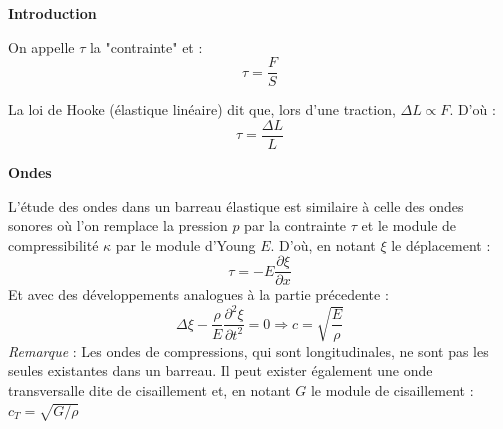 \noindent\textbf{Introduction}


On appelle $\tau$ la "contrainte" et :
\[\tau=\frac{F}{S}\]

La loi de Hooke (élastique linéaire) dit que, lors d'une traction, $\Delta L \propto F$. D'où :
\[ \tau = \frac{\Delta L}{L} \]

\noindent\textbf{Ondes}

L'étude des ondes dans un barreau élastique est similaire à celle des ondes sonores où l'on remplace la pression $p$ par la contrainte $\tau$ et le module de compressibilité $\kappa$ par le module d'Young $E$. D'où, en notant $\xi$ le déplacement :
\[ \tau = -E\frac{\partial \xi}{\partial x} \]
Et avec des développements analogues à la partie précedente :
\[ \Delta\xi-\frac{\rho}{E}\frac{\partial^2\xi}{\partial t^2}=0 \Rightarrow c=\sqrt{\frac{E}{\rho}} \]
\emph{Remarque } : Les ondes de compressions, qui sont longitudinales, ne sont pas les seules existantes dans un barreau. Il peut exister également une onde transversalle dite de cisaillement et, en notant $G$ le module de cisaillement : $c_T=\sqrt{G/\rho}$

